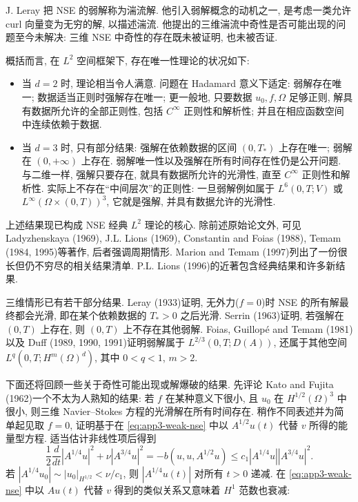 J. Leray 把 NSE 的弱解称为湍流解. 他引入弱解概念的动机之一, 是考虑一类允许 curl 向量变为无穷的解, 以描述湍流. 他提出的三维湍流中奇性是否可能出现的问题至今未解决: 三维 NSE 中奇性的存在既未被证明, 也未被否证.

\hypertarget{appendix-03-page-359}{}
概括而言, 在 $L^2$ 空间框架下, 存在唯一性理论的状况如下:
\begin{itemize}
\item 当 $d=2$ 时, 理论相当令人满意. 问题在 Hadamard 意义下适定: 弱解存在唯一; 数据适当正则时强解存在唯一; 更一般地, 只要数据 $u_0,f,\Omega$ 足够正则, 解具有数据所允许的全部正则性, 包括 $C^\infty$ 正则性和解析性; 并且在相应函数空间中连续依赖于数据.
\item 当 $d=3$ 时, 只有部分结果: 强解在依赖数据的区间 $(0,T_*)$ 上存在唯一; 弱解在 $(0,+\infty)$ 上存在. 弱解唯一性以及强解在所有时间存在性仍是公开问题. 与二维一样, 强解只要存在, 就具有数据所允许的光滑性, 直至 $C^\infty$ 正则性和解析性. 实际上不存在``中间层次''的正则性: 一旦弱解例如属于 $L^6(0,T;V)$ 或 $L^\infty(\Omega\times(0,T))^3$, 它就是强解, 并具有数据允许的光滑性.
\end{itemize}

\begin{Remark}
\label{rem:app3-classical-l2-theory}
上述结果现已构成 NSE 经典 $L^2$ 理论的核心. 除前述原始论文外, 可见 Ladyzhenskaya (1969), J.L. Lions (1969), Constantin and Foias (1988), Temam (1984, 1995)等著作, 后者强调周期情形. Marion and Temam (1997)列出了一份很长但仍不穷尽的相关结果清单. P.L. Lions (1996)的近著包含经典结果和许多新结果.
\end{Remark}

三维情形已有若干部分结果. Leray (1933)证明, 无外力($f=0$)时 NSE 的所有解最终都会光滑, 即在某个依赖数据的 $T_*>0$ 之后光滑. Serrin (1963)证明, 若强解在 $(0,T)$ 上存在, 则 $(0,T)$ 上不存在其他弱解. Foias, Guillopé and Temam (1981)以及 Duff (1989, 1990, 1991)证明弱解属于 $L^{2/3}(0,T;D(A))$, 还属于其他空间 $L^q(0,T;H^m(\Omega)^d)$, 其中 $0<q<1$, $m>2$.

下面还将回顾一些关于奇性可能出现或解爆破的结果. 先评论 Kato and Fujita (1962)一个不太为人熟知的结果: 若 $f$ 在某种意义下很小, 且 $u_0$ 在 $H^{1/2}(\Omega)^3$ 中很小, 则三维 Navier--Stokes 方程的光滑解在所有时间存在. 稍作不同表述并为简单起见取 $f=0$, 证明基于在 
\eqref{eq:app3-weak-nse} 中以 $A^{1/2}u(t)$ 代替 $v$ 所得的能量型方程. 适当估计非线性项后得到
\[
\frac12\frac d{dt}|A^{1/4}u|^2+\nu|A^{3/4}u|^2
=-b(u,u,A^{1/2}u)
\leq c_1|A^{1/4}u||A^{3/4}u|^2.
\]
若 $|A^{1/4}u_0|\sim|u_0|_{H^{1/2}}<\nu/c_1$, 则 $|A^{1/4}u(t)|$ 对所有 $t>0$ 递减. 在 
\eqref{eq:app3-weak-nse} 中以 $Au(t)$ 代替 $v$ 得到的类似关系又意味着 $H^1$ 范数也衰减:

